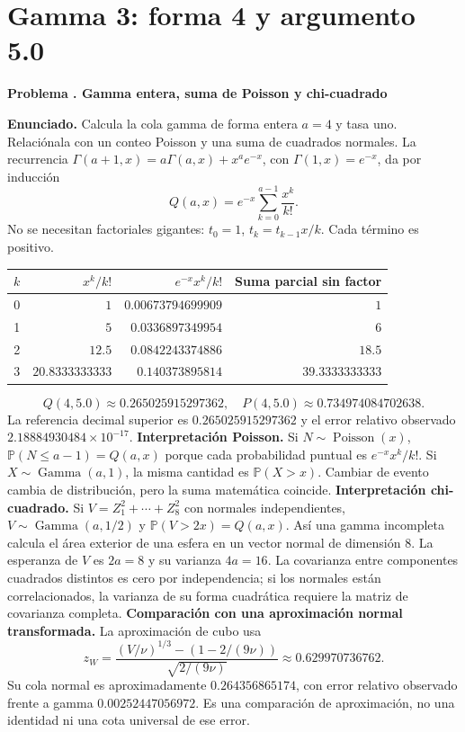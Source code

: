 \documentclass[11pt,a4paper]{article}
\newcommand{\Prob}{\mathbb P}
\theoremstyle{definition}
\newcounter{problema}
\newenvironment{resuelto}[1]{\refstepcounter{problema}\par\medskip\Needspace{6\baselineskip}\textbf{Problema \theproblema. #1}\par}{\par\medskip}
\begin{document}
\section{Gamma 3: forma 4 y argumento 5.0}
\begin{resuelto}{Gamma entera, suma de Poisson y chi-cuadrado}
\textbf{Enunciado.} Calcula la cola gamma de forma entera $a=4$ y tasa uno. Relaciónala con un conteo Poisson y una suma de cuadrados normales.
La recurrencia $\Gamma(a+1,x)=a\Gamma(a,x)+x^ae^{-x}$, con $\Gamma(1,x)=e^{-x}$, da por inducción
\[
Q(a,x)=e^{-x}\sum_{k=0}^{a-1}\frac{x^k}{k!}.
\]
No se necesitan factoriales gigantes: $t_0=1$, $t_k=t_{k-1}x/k$. Cada término es positivo.

\begin{center}\small\begin{tabular}{rrrr}
\toprule
$k$&$x^k/k!$&$e^{-x}x^k/k!$&Suma parcial sin factor\\
\midrule
0&$1$&$0.00673794699909$&$1$\\
1&$5$&$0.0336897349954$&$6$\\
2&$12.5$&$0.0842243374886$&$18.5$\\
3&$20.8333333333$&$0.140373895814$&$39.3333333333$\\
\bottomrule\end{tabular}\end{center}
\[
Q(4,5.0)\approx0.265025915297362,\quad
P(4,5.0)\approx0.734974084702638.
\]
La referencia decimal superior es $0.265025915297362$ y el error relativo observado $2.18884930484\times10^{-17}$.
\textbf{Interpretación Poisson.} Si $N\sim\operatorname{Poisson}(x)$, $\Prob(N\le a-1)=Q(a,x)$ porque cada probabilidad puntual es $e^{-x}x^k/k!$. Si $X\sim\operatorname{Gamma}(a,1)$, la misma cantidad es $\Prob(X>x)$. Cambiar de evento cambia de distribución, pero la suma matemática coincide.
\textbf{Interpretación chi-cuadrado.} Si $V=Z_1^2+\cdots+Z_{8}^2$ con normales independientes, $V\sim\operatorname{Gamma}(a,1/2)$ y $\Prob(V>2x)=Q(a,x)$. Así una gamma incompleta calcula el área exterior de una esfera en un vector normal de dimensión 8.
La esperanza de $V$ es $2a=8$ y su varianza $4a=16$. La covarianza entre componentes cuadrados distintos es cero por independencia; si los normales están correlacionados, la varianza de su forma cuadrática requiere la matriz de covarianza completa.
\textbf{Comparación con una aproximación normal transformada.} La aproximación de cubo usa
\[
z_W=\frac{(V/\nu)^{1/3}-(1-2/(9\nu))}{\sqrt{2/(9\nu)}}\approx0.629970736762.
\]
Su cola normal es aproximadamente $0.264356865174$, con error relativo observado frente a gamma $0.00252447056972$. Es una comparación de aproximación, no una identidad ni una cota universal de ese error.
\end{resuelto}
\end{document}
